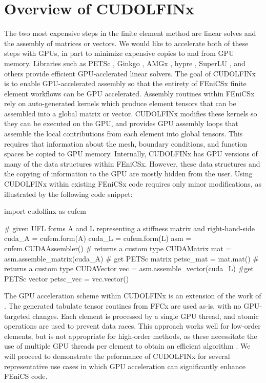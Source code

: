 \section*{Overview of CUDOLFINx}

The two most expensive steps in the finite element method are linear solves and the assembly of matrices or vectors. We would like to accelerate both of these steps with GPUs, in part to minimize expensive copies to and from GPU memory. Libraries such as PETSc \citep{MILLS2021102831},  Ginkgo \citep{ginkgo-toms-2022}, AMGx \citep{naumov2015amgx}, hypre \citep{li2020efficient, falgout2021porting}, SuperLU \citep{li2023newly}, and others \citep{lu2023tilesptrsv} provide efficient GPU-acclerated linear solvers. The goal of CUDOLFINx is to enable GPU-accelerated assembly so that the entirety of FEniCSx finite element workflows can be GPU accelerated. Assembly routines within FEniCSx rely on auto-generated kernels which produce element tensors that can be assembled into a global matrix or vector. CUDOLFINx modifies these kernels so they can be executed on the GPU, and provides GPU assembly loops that assemble the local contributions from each element into global tensors. This requires that information about the mesh, boundary conditions, and function spaces be copied to GPU memory. Internally, CUDOLFINx has GPU versions of many of the data structures within FEniCSx. However, these data structures and the copying of information to the GPU are mostly hidden from the user. Using CUDOLFINx within existing FEniCSx code requires only minor modifications, as illustrated by the following code snippet:

\begin{python}
import cudolfinx as cufem

# given UFL forms A and L representing a stiffness matrix and right-hand-side
cuda_A = cufem.form(A)
cuda_L = cufem.form(L)
asm = cufem.CUDAAssembler()
# returns a custom type CUDAMatrix
mat = asm.assemble_matrix(cuda_A)
# get PETSc matrix
petsc_mat = mat.mat()
# returns a custom type CUDAVector
vec = asm.assemble_vector(cuda_L)
#get PETSc vector
petsc_vec = vec.vector()
\end{python}

The GPU acceleration scheme within CUDOLFINx is an extension of the work of \cite{trotter2023targeting}. The generated tabulate tensor routines from FFCx are used as-is, with no GPU-targeted changes. Each element is processed by a single GPU thread, and atomic operations are used to prevent data races. This approach works well for low-order elements, but is not appropriate for high-order methods, as these necessitate the use of multiple GPU threads per element to obtain an efficient algorithm \citep{MACIOL20101093,dziekonski2013generation,banas2014numerical}. We will proceed to demonstrate the peformance of CUDOLFINx for several representative use cases in which GPU acceleration can significantly enhance FEniCS code.

